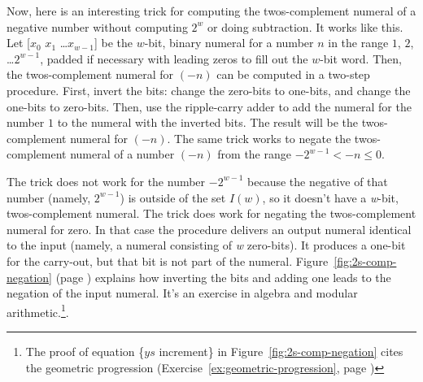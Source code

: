 Now, here is an interesting
trick
for computing the twos-complement numeral of a negative number without
computing $2^w$ or doing subtraction.
It works like this.
Let \textsf{[$x_0$ $x_1$ \dots $x_{w-1}$]}
be the $w$-bit, binary numeral for a number $n$ in the range $1$, $2$, \dots $2^{w-1}$,
padded if necessary with leading zeros to fill out the $w$-bit word.
Then, the twos-complement numeral for $(-n)$ can be computed
in a two-step procedure.
First, invert the bits: change the zero-bits to one-bits,
and change the one-bits to zero-bits.
Then, use the ripple-carry adder to add the numeral for the number $1$
to the numeral with the inverted bits.
The result will be the twos-complement numeral for $(-n)$.
The same trick works to negate the twos-complement numeral
of a number $(-n)$ from the range $-2^{w-1} < -n \leq 0$.

The trick does not work for the number $-2^{w-1}$
because the negative of that number (namely, $2^{w-1}$)
is outside of the set $I(w)$,
so it doesn't have a \emph{w}-bit, twos-complement numeral.
The trick does work for negating the twos-complement numeral for zero.
In that case the procedure delivers an output numeral identical
to the input (namely, a numeral consisting of \emph{w} zero-bits).
It produces a one-bit for the carry-out, but that bit is not part of the numeral.
Figure~\ref{fig:2s-comp-negation}
(page \pageref{fig:2s-comp-negation})
explains how inverting the bits and adding one leads to the negation
of the input numeral.
It's an exercise in algebra and modular arithmetic.\footnote{The
proof of equation \{$ys$ increment\}
in Figure~\ref{fig:2s-comp-negation}
cites the geometric progression
(Exercise~\ref{ex:geometric-progression}, page \pageref{ex:geometric-progression})}.

